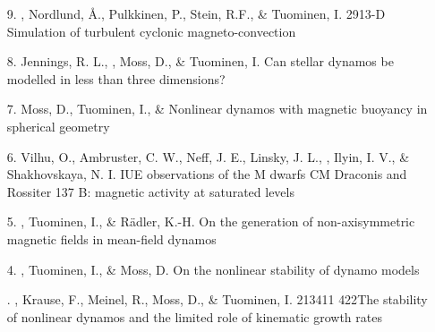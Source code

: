 \begin{itemize}
\item[9.]
\Brandenburg, Nordlund, \AA., Pulkkinen, P., Stein, R.F., \& Tuominen, I.
{291}{3-D Simulation of turbulent cyclonic magneto-convection}

\item[8.]
Jennings, R. L., \Brandenburg, Moss, D., \& Tuominen, I.
{Can stellar dynamos be modelled in less than three dimensions?}

\item[7.]
Moss, D., Tuominen, I., \& \Brandenburg{}
{Nonlinear dynamos with magnetic buoyancy in spherical geometry}

\item[6.]
Vilhu, O., Ambruster, C. W., Neff, J. E., Linsky, J. L., \Brandenburg,
Ilyin, I. V., \& Shakhovskaya, N. I.
{IUE observations of the M dwarfs CM Draconis and Rossiter 137 B:
magnetic activity at saturated levels}

\item[5.]
\Brandenburg, Tuominen, I., \& R\"adler, K.-H.
{On the generation of non-axisymmetric magnetic fields in mean-field dynamos}

\item[4.]
\Brandenburg, Tuominen, I., \& Moss, D.
{On the nonlinear stability of dynamo models}

\item[\important 3.]
\Brandenburg, Krause, F., Meinel, R., Moss, D., \& Tuominen,
I. {213}{411}
{422}{The stability of nonlinear dynamos and the limited role of kinematic growth rates}
 

\end{itemize}
